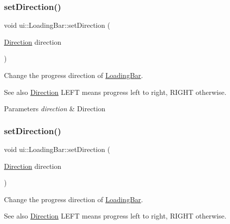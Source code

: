 \subsubsection{\texorpdfstring{set\+Direction()}{setDirection()}\hspace{0.1cm}{\footnotesize\ttfamily [1/2]}}
{\footnotesize\ttfamily void ui\+::\+Loading\+Bar\+::set\+Direction (\begin{DoxyParamCaption}\item[{\hyperlink{classui_1_1LoadingBar_a4407b3ce72891a78755e25d765e25063}{Direction}}]{direction }\end{DoxyParamCaption})}

Change the progress direction of \hyperlink{classui_1_1LoadingBar}{Loading\+Bar}.

\begin{DoxySeeAlso}{See also}
\hyperlink{classui_1_1LoadingBar_a4407b3ce72891a78755e25d765e25063}{Direction} {\ttfamily L\+E\+FT} means progress left to right, {\ttfamily R\+I\+G\+HT} otherwise. 
\end{DoxySeeAlso}

\begin{DoxyParams}{Parameters}
{\em direction} & Direction \\
\hline
\end{DoxyParams}
\mbox{\label{classui_1_1LoadingBar_a66c628ef4dd8a717f7a5fad13f9306a9}} 
\subsubsection{\texorpdfstring{set\+Direction()}{setDirection()}\hspace{0.1cm}{\footnotesize\ttfamily [2/2]}}
{\footnotesize\ttfamily void ui\+::\+Loading\+Bar\+::set\+Direction (\begin{DoxyParamCaption}\item[{\hyperlink{classui_1_1LoadingBar_a4407b3ce72891a78755e25d765e25063}{Direction}}]{direction }\end{DoxyParamCaption})}

Change the progress direction of \hyperlink{classui_1_1LoadingBar}{Loading\+Bar}.

\begin{DoxySeeAlso}{See also}
\hyperlink{classui_1_1LoadingBar_a4407b3ce72891a78755e25d765e25063}{Direction} {\ttfamily L\+E\+FT} means progress left to right, {\ttfamily R\+I\+G\+HT} otherwise. 
\end{DoxySeeAlso}

